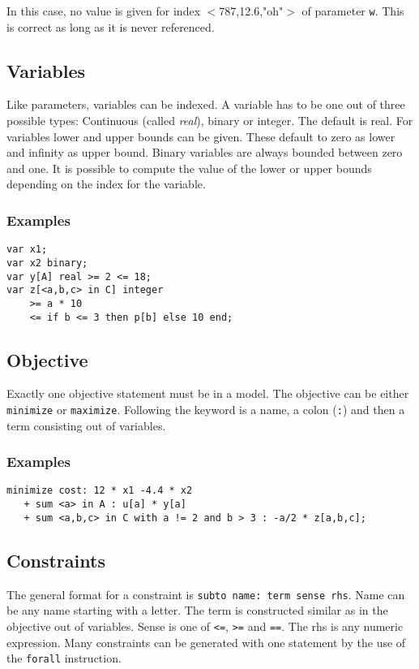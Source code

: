 \documentclass[12pt]{article}
\newcommand{\code}[1]{{\tt #1}\xspace}
\begin{document}
\medskip
In this case, no value is given for index $<$787,12.6,"oh"$>$ of parameter
\code{w}. This is correct as long as it is never referenced.

\subsection{Variables}
Like parameters, variables can be indexed. 
A variable has to be one out of three possible types: 
Continuous (called {\em real}), binary or integer. The default is real. 
For variables lower and upper bounds can be given. These default to
zero as lower and infinity as upper bound. Binary variables are
always bounded between zero and one.
It is possible to compute the value of the lower or upper bounds
depending on the index for the variable.
\subsubsection{Examples}
{\small 
\begin{verbatim}
var x1;
var x2 binary;
var y[A] real >= 2 <= 18;
var z[<a,b,c> in C] integer 
    >= a * 10 
    <= if b <= 3 then p[b] else 10 end; 
\end{verbatim}
}

\subsection{Objective}
Exactly one objective statement must be in a model. The objective
can be either \code{minimize} or \code{maximize}. Following the
keyword is a name, a colon (\code{:}) and then a term consisting 
out of variables.

\subsubsection{Examples}
{\small 
\begin{verbatim}
minimize cost: 12 * x1 -4.4 * x2 
   + sum <a> in A : u[a] * y[a]
   + sum <a,b,c> in C with a != 2 and b > 3 : -a/2 * z[a,b,c];
\end{verbatim}
}

\subsection{Constraints}
The general format for a constraint is 
\code{subto name: term sense rhs}.
Name can be any name starting with a letter. The term is constructed
similar as in the objective out of variables. Sense is one of
\code{<=}, \code{>=} and \code{==}. The rhs is any numeric expression.
Many constraints can be generated with one statement by the use of the
\code{forall} instruction. 
\end{document}
